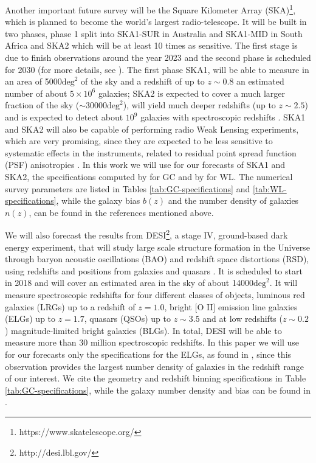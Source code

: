 Another important future survey will be the Square Kilometer Array (SKA)\footnote{https://www.skatelescope.org/}, 
which is planned to become the world's largest radio-telescope. 
It will be built in two phases, phase 1 split into SKA1-SUR in Australia and SKA1-MID in South Africa and SKA2 which will be at least 10 times as sensitive. 
The first stage is due to finish observations around the year 2023 and the second phase is scheduled for 2030 
(for more details, see \cite{yahya_cosmological_2015,santos_hi_2015,raccanelli_measuring_2015,bull_measuring_2015}). 
The first phase SKA1, will be able to measure in an area of 5000$\text{deg}^2$ of the sky and a redshift of up to $z\sim0.8$  an estimated number of about $5\times10^6$ galaxies; SKA2 is expected to cover a much larger fraction of the sky ($\sim$30000$\text{deg}^2$), will yield much deeper redshifts (up to $z\sim2.5$) and is expected to detect about $10^9$ galaxies with spectroscopic redshifts \cite{santos_hi_2015}.
SKA1 and SKA2 will also be capable of performing 
radio Weak Lensing experiments, which are very promising, since they are expected to be less sensitive to systematic effects in the instruments, related to residual point spread function (PSF) anisotropies \cite{harrison_ska_2016}.
In this work we will use for our forecasts of SKA1 and SKA2, the specifications computed by \cite{santos_hi_2015} for GC and by \cite{harrison_ska_2016} for WL. The numerical survey parameters are listed in Tables \ref{tab:GC-specifications} and \ref{tab:WL-specifications}, while the galaxy bias $b(z)$ and the number density of galaxies $n(z)$, can be found in the references mentioned above.

We will also forecast the results from DESI\footnote{http://desi.lbl.gov/}, a stage IV, ground-based dark energy experiment, that will study large scale structure formation in the Universe through baryon acoustic oscillations (BAO) and redshift space distortions (RSD), using redshifts and positions from galaxies and quasars \cite{desi_collaboration_desi_2016-1,desi_collaboration_desi_2016,levi_desi_2013}.
It is scheduled to start in 2018 
and will cover an estimated area in the sky of about 
14000$\text{deg}^2$. It will measure spectroscopic redshifts for four different classes of objects, luminous red galaxies (LRGs) up to a redshift of $z=1.0$, bright [O II] emission line galaxies (ELGs) up to $z=1.7$, quasars (QSOs) up to $z\sim3.5$ and at low redshifts ($z\sim0.2$) magnitude-limited bright galaxies (BLGs). In total, 
DESI will be able to measure more than 30 million spectroscopic redshifts.
In this paper we will use for our forecasts only the specifications for the ELGs, as found in \cite{desi_collaboration_desi_2016-1}, since this observation provides the largest number density of galaxies in the redshift range of our interest. We cite the geometry and redshift binning specifications in Table \ref{tab:GC-specifications}, while the galaxy number density and bias can be found in \cite{desi_collaboration_desi_2016-1}.




